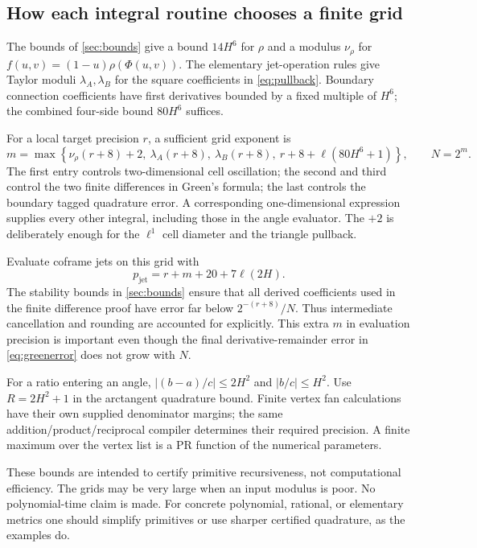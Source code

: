 \subsection{How each integral routine chooses a finite grid}

The bounds of \cref{sec:bounds} give a bound $14H^6$ for $\rho$ and a modulus $\nu_\rho$ for
$f(u,v)=(1-u)\rho(\Phi(u,v))$. The elementary jet-operation rules give Taylor moduli $\lambda_A,\lambda_B$ for the square coefficients in \eqref{eq:pullback}. Boundary connection coefficients have first derivatives bounded by a fixed multiple of $H^6$; the combined four-side bound $80H^6$ suffices.

For a local target precision $r$, a sufficient grid exponent is
\begin{equation}\label{eq:gridexp}
m=\max\left\{
\nu_\rho(r+8)+2,\ \lambda_A(r+8),\ \lambda_B(r+8),\
r+8+\ell(80H^6+1)\right\},\qquad N=2^m.
\end{equation}
The first entry controls two-dimensional cell oscillation; the second and third control the two finite differences in Green's formula; the last controls the boundary tagged quadrature error. A corresponding one-dimensional expression supplies every other integral, including those in the angle evaluator. The $+2$ is deliberately enough for the $\ell^1$ cell diameter and the triangle pullback.

Evaluate coframe jets on this grid with
\begin{equation}\label{eq:evalbits}
p_{\mathrm{jet}}=r+m+20+7\ell(2H).
\end{equation}
The stability bounds in \cref{sec:bounds} ensure that all derived coefficients used in the finite difference proof have error far below $2^{-(r+8)}/N$. Thus intermediate cancellation and rounding are accounted for explicitly. This extra $m$ in evaluation precision is important even though the final derivative-remainder error in \eqref{eq:greenerror} does not grow with $N$.

For a ratio entering an angle, $|(b-a)/c|\le2H^2$ and $|b/c|\le H^2$. Use $R=2H^2+1$ in the arctangent quadrature bound. Finite vertex fan calculations have their own supplied denominator margins; the same addition/product/reciprocal compiler determines their required precision. A finite maximum over the vertex list is a PR function of the numerical parameters.

These bounds are intended to certify primitive recursiveness, not computational efficiency. The grids may be very large when an input modulus is poor. No polynomial-time claim is made. For concrete polynomial, rational, or elementary metrics one should simplify primitives or use sharper certified quadrature, as the examples do.

